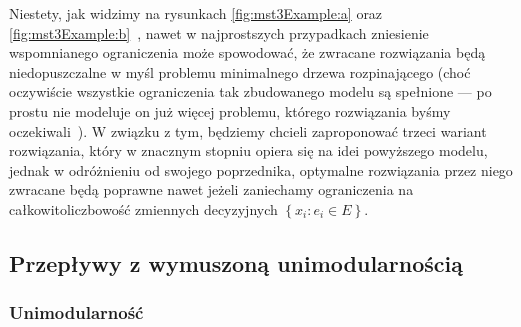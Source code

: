 Niestety, jak widzimy na rysunkach \ref{fig:mst3Example:a} oraz \ref{fig:mst3Example:b}~\cite[$41$]{Magnanti1995503}, nawet w najprostszych przypadkach zniesienie wspomnianego ograniczenia może spowodować, że zwracane rozwiązania będą niedopuszczalne w myśl problemu minimalnego drzewa rozpinającego (choć oczywiście wszystkie ograniczenia tak zbudowanego modelu są spełnione --- po prostu nie modeluje on już więcej problemu, którego rozwiązania byśmy oczekiwali~\cite[$39$]{Magnanti1995503}). W związku z tym, będziemy chcieli zaproponować trzeci wariant rozwiązania, który w znacznym stopniu opiera się na idei powyższego modelu, jednak w odróżnieniu od swojego poprzednika, optymalne rozwiązania przez niego zwracane będą poprawne nawet jeżeli zaniechamy ograniczenia na całkowitoliczbowość zmiennych decyzyjnych $\left\{ x_{i} : e_{i} \in E \right\}$.

\subsection{Przepływy z wymuszoną unimodularnością}

\subsubsection{Unimodularność}


